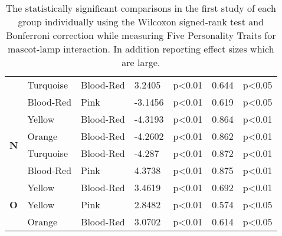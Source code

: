 \begin{table}
\begin{center}
\begin{tabular} { |p{0.5cm}| p{2cm}|p{2cm}|p{1.5cm}| p{1.7cm}|p{1cm}|p{1.5cm}|  }
            &Turquoise &Blood-Red &3.2405 &p<0.01 &0.644 &p<0.05\\
            &Blood-Red &Pink &-3.1456 &p<0.01 &0.619 &p<0.05\\
            \hline
            \hline
            \multirow{4}{*}{\textbf{N}}
            &Yellow &Blood-Red &-4.3193 &p<0.01 &0.864 &p<0.01\\
            &Orange &Blood-Red &-4.2602 &p<0.01 &0.862 &p<0.01\\
            &Turquoise &Blood-Red &-4.287 &p<0.01 &0.872 &p<0.01\\
            &Blood-Red &Pink &4.3738 &p<0.01 &0.875 &p<0.01\\
            \hline
            \hline
            \multirow{4}{*}{\textbf{O}}
            &Yellow &Blood-Red &3.4619 &p<0.01 &0.692 &p<0.01\\
            &Yellow &Pink &2.8482 &p<0.01 &0.574 &p<0.05\\
            &Orange &Blood-Red &3.0702 &p<0.01 &0.614 &p<0.05\\
            \hline
        \end{tabular}
    \end{center}
    \captionsetup{width=13.5cm}
    \caption{The statistically significant comparisons in the first study of each group individually using the Wilcoxon signed-rank
    test and Bonferroni correction while measuring Five Personality Traits for mascot-lamp interaction.
    In addition reporting effect sizes which are large.}
    \label{table:wilcoxML1}
\end{table}

